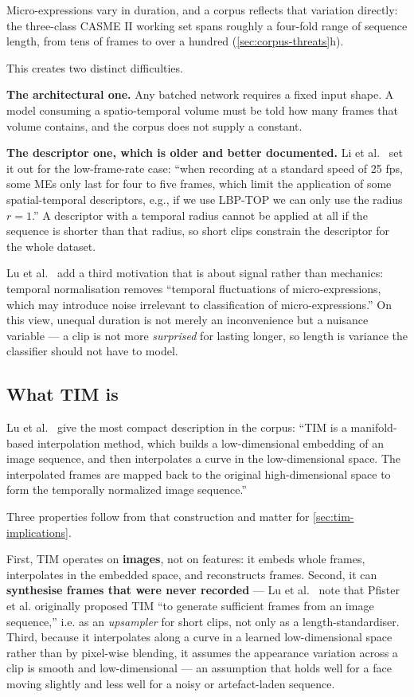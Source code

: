 Micro-expressions vary in duration, and a corpus reflects that variation directly: the three-class CASME II working set spans roughly a four-fold range of sequence length, from tens of frames to over a hundred (\autoref{sec:corpus-threats}h).

This creates two distinct difficulties.

\textbf{The architectural one.} Any batched network requires a fixed input shape. A model consuming a spatio-temporal volume must be told how many frames that volume contains, and the corpus does not supply a constant.

\textbf{The descriptor one, which is older and better documented.} Li et al.~\cite{liX2018} set it out for the low-frame-rate case: ``when recording at a standard speed of 25 fps, some MEs only last for four to five frames, which limit the application of some spatial-temporal descriptors, e.g., if we use LBP-TOP we can only use the radius $r = 1$.'' A descriptor with a temporal radius cannot be applied at all if the sequence is shorter than that radius, so short clips constrain the descriptor for the whole dataset.

Lu et al.~\cite{lu2015} add a third motivation that is about signal rather than mechanics: temporal normalisation removes ``temporal fluctuations of micro-expressions, which may introduce noise irrelevant to classification of micro-expressions.'' On this view, unequal duration is not merely an inconvenience but a nuisance variable --- a clip is not more \textit{surprised} for lasting longer, so length is variance the classifier should not have to model.

\subsection{What TIM is}
\label{sec:tim-what}

Lu et al.~\cite{lu2015} give the most compact description in the corpus: ``TIM is a manifold-based interpolation method, which builds a low-dimensional embedding of an image sequence, and then interpolates a curve in the low-dimensional space. The interpolated frames are mapped back to the original high-dimensional space to form the temporally normalized image sequence.''

Three properties follow from that construction and matter for \autoref{sec:tim-implications}.

First, TIM operates on \textbf{images}, not on features: it embeds whole frames, interpolates in the embedded space, and reconstructs frames. Second, it can \textbf{synthesise frames that were never recorded} --- Lu et al.~\cite{lu2015} note that Pfister et al. originally proposed TIM ``to generate sufficient frames from an image sequence,'' i.e. as an \textit{upsampler} for short clips, not only as a length-standardiser. Third, because it interpolates along a curve in a learned low-dimensional space rather than by pixel-wise blending, it assumes the appearance variation across a clip is smooth and low-dimensional --- an assumption that holds well for a face moving slightly and less well for a noisy or artefact-laden sequence.

